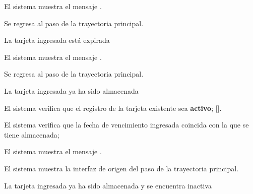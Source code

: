 {\begin{trayectoriaAlternativa}
    \item El sistema muestra el mensaje
      .

    \item Se regresa al paso  de la trayectoria
      principal.

  \end{trayectoriaAlternativa}


  \begin{trayectoriaAlternativa}
    {La tarjeta ingresada está expirada}

    \item El sistema muestra el mensaje
      .

    \item Se regresa al paso  de la trayectoria
      principal.

  \end{trayectoriaAlternativa}


  \begin{trayectoriaAlternativa}
    {La tarjeta ingresada ya ha sido almacenada}

    \item El sistema verifica que el registro de la tarjeta existente sea
      \textbf{activo}; [].

    \item El sistema verifica que la fecha de vencimiento ingresada coincida
      con la que se tiene almacenada;

    \item El sistema muestra el mensaje
      .

    \item El sistema muestra la interfaz de origen del paso
       de la trayectoria principal.

  \end{trayectoriaAlternativa}


  \begin{trayectoriaAlternativa}
    {La tarjeta ingresada ya ha sido almacenada y se encuentra inactiva}


\end{trayectoriaAlternativa}}
